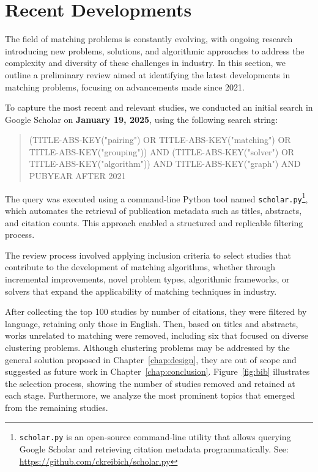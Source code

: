         

   \section{Recent Developments}

    The field of matching problems is constantly evolving, with ongoing research introducing new problems, solutions, and algorithmic approaches to address the complexity and diversity of these challenges in industry. In this section, we outline a preliminary review aimed at identifying the latest developments in matching problems, focusing on advancements made since 2021.

    To capture the most recent and relevant studies, we conducted an initial search in Google Scholar on \textbf{January 19, 2025}, using the following search string:

    \begin{quote}
    (TITLE-ABS-KEY("pairing") OR TITLE-ABS-KEY("matching") OR TITLE-ABS-KEY("grouping")) AND (TITLE-ABS-KEY("solver") OR TITLE-ABS-KEY("algorithm")) AND TITLE-ABS-KEY("graph") AND PUBYEAR AFTER 2021
    \end{quote}

    The query was executed using a command-line Python tool named \texttt{scholar.py}\footnote{\texttt{scholar.py} is an open-source command-line utility that allows querying Google Scholar and retrieving citation metadata programmatically. See: \url{https://github.com/ckreibich/scholar.py}}, which automates the retrieval of publication metadata such as titles, abstracts, and citation counts. This approach enabled a structured and replicable filtering process.

    The review process involved applying inclusion criteria to select studies that contribute to the development of matching algorithms, whether through incremental improvements, novel problem types, algorithmic frameworks, or solvers that expand the applicability of matching techniques in industry.

    After collecting the top 100 studies by number of citations, they were filtered by language, retaining only those in English. Then, based on titles and abstracts, works unrelated to matching were removed, including six that focused on diverse clustering problems. Although clustering problems may be addressed by the general solution proposed in Chapter~\ref{chap:design}, they are out of scope and suggested as future work in Chapter~\ref{chap:conclusion}. Figure~\ref{fig:bib} illustrates the selection process, showing the number of studies removed and retained at each stage. Furthermore, we analyze the most prominent topics that emerged from the remaining studies.

